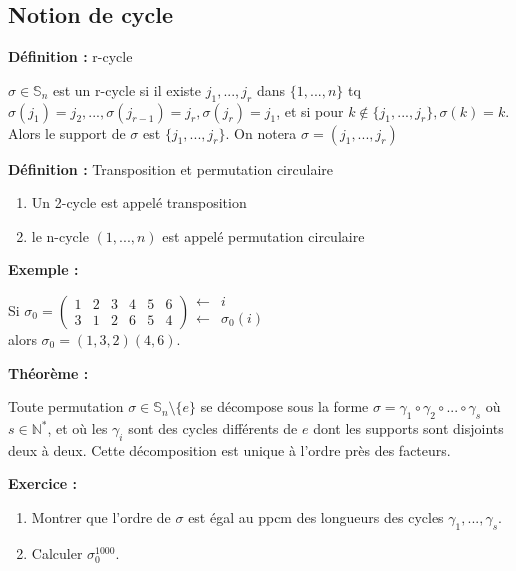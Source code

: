 \documentclass{report}
\newenvironment{definition}[1][]{
    \begin{tcolorbox}[colframe= white]
    \textbf{Définition :} 
    #1 \par
    }
    {\end{tcolorbox}}
\newenvironment{exemple}{\begin{tcolorbox}[colback=gray!10,colframe= white]
    \textbf{Exemple :}
     \par}
    {\end{tcolorbox}}
\newenvironment{exo}{\begin{tcolorbox}[colframe= white]
    \textbf{Exercice :}
    \par}
    {\end{tcolorbox}}
\newenvironment{theoreme}[1][]{
    \begin{tcolorbox}[]
    \textbf{Théorème :} #1  \par} 
    {\end{tcolorbox}}
\newcommand{\N}{\mathbb{N}}
\newcommand{\sn}{\mathbb{S}_n}
\newcommand{\unn}{\{1, ..., n\}}
\newcommand{\dsp}{\displaystyle}
\begin{document}
\subsection{Notion de cycle}
\begin{definition}[r-cycle]
$\sigma \in\sn$ est un r-cycle si il existe $j_1, ..., j_r$ dans $\unn$ tq $\sigma(j_1)=j_2, ..., \sigma(j_{r-1})=j_r, \sigma(j_r)=j_1$, et si pour $k\notin\{j_1,...,j_r\}, \sigma(k)=k$.\\Alors le support de $\sigma$ est $\{j_1,...,j_r\}$. On notera $\sigma = (j_1, ..., j_r)$
\end{definition}

\begin{definition}[Transposition et permutation circulaire]
\begin{enumerate}
\item Un 2-cycle est appelé transposition
\item le n-cycle $(1, ..., n)$ est appelé permutation circulaire
\end{enumerate}
\end{definition}

\begin{exemple}
Si $\dsp\sigma_0=\left(\begin{array}{cccccc}
1&2&3&4&5&6\\3&1&2&6&5&4
\end{array}\right)
\begin{array}{cl}
\leftarrow&i\\\leftarrow&\sigma_0(i)
\end{array}$\\
alors $\sigma_0=(1,3,2)(4,6)$.
\end{exemple}

\begin{theoreme}
Toute permutation $\sigma\in\sn\setminus\{e\}$ se décompose sous la forme $\sigma=\gamma_1\circ\gamma_2\circ ... \circ\gamma_s$ où $s\in\N^*$, et où les $\gamma_i$ sont des cycles différents de $e$ dont les supports sont disjoints deux à deux. Cette décomposition est unique à l'ordre près des facteurs.
\end{theoreme}

\begin{exo}
\begin{enumerate}
\item Montrer que l'ordre de $\sigma$ est égal au ppcm des longueurs des cycles $\gamma_1, ..., \gamma_s$.
\item Calculer $\sigma_0^{1000}$.
\end{enumerate}
\end{exo}
\end{document}
